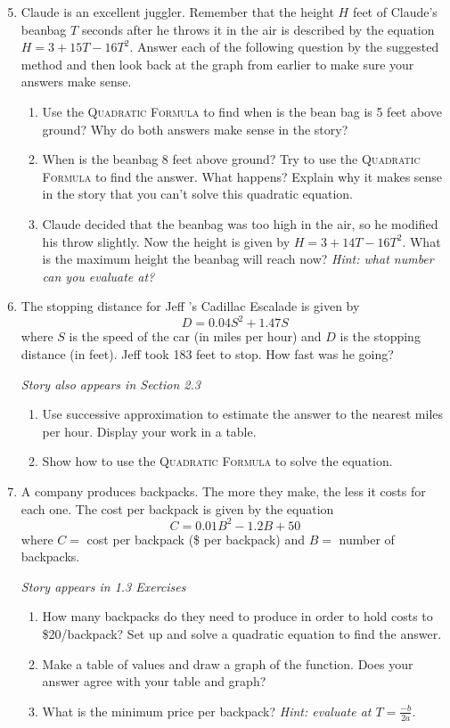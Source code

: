 \begin{enumerate} 
\setcounter{enumi}{4}

\item Claude is an excellent juggler.  Remember that the height $H$ feet of Claude's beanbag $T$ seconds after he throws it in the air is described by the equation $H = 3+15T-16T^2$. Answer each of the following question by the suggested method and then look back at the graph from earlier to make sure your answers make sense.
\begin{enumerate}
\item Use the \textsc{Quadratic Formula} to find when is the bean bag is 5 feet above ground?  Why do both answers make sense in the story?
\item When is the beanbag 8 feet above ground?  Try to use the \textsc{Quadratic Formula} to find the answer.  What happens?  Explain why it makes sense in the story that you can't solve this quadratic equation.
\item Claude decided that the beanbag was too high in the air, so he modified his throw slightly.  Now the height is given by $H = 3+14T-16T^2$.  What is the maximum height the beanbag will reach now?  \emph{Hint:  what number can you evaluate at?}
\end{enumerate}

\item The stopping distance for Jeff 's Cadillac Escalade is given by  $$D=0.04S^2+1.47S$$ where $S$ is the speed of the car (in miles per hour) and $D$ is the stopping distance (in feet). Jeff took 183 feet to stop.  How fast was he going? 

\hfill \emph{Story also appears in Section 2.3}
\begin{enumerate}
\item Use successive approximation to estimate the answer to the nearest miles per hour.  Display your work in a table.
\item Show how to use the \textsc{Quadratic Formula} to solve the equation.
\end{enumerate}

\item A company produces backpacks.  The more they make, the less it costs for each one. The cost per backpack is given by the equation $$C = 0.01B^2 -1.2B + 50$$ where $C=$ cost per backpack (\$ per backpack) and $B=$ number of backpacks.

\hfill \emph{Story appears in 1.3 Exercises}
\begin{enumerate}
\item How many backpacks do they need to produce in order to hold costs to \$20/backpack?  Set up and solve a quadratic equation to find the answer.
\item Make a table of values and draw a graph of the function. Does your answer agree with your table and graph?  
\item What is the minimum price per backpack?  \emph{Hint:  evaluate at $T= \frac{-b}{2a}$.}
\end{enumerate}


\end{enumerate}
